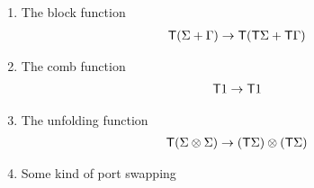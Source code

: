 \begin{definition}
\begin{enumerate}
\item The block function
    \begin{align*}
        \mathsf T (\Sigma + \Gamma) \to \mathsf T (\mathsf T \Sigma + \mathsf T \Gamma)
    \end{align*}
    \item The  comb function 
    \begin{align*}
        \mathsf T 1 \to \mathsf T 1
    \end{align*}
    \item The unfolding function 
\begin{align*}
    \mathsf T (\Sigma \otimes \Sigma) \to (\mathsf T \Sigma) \otimes (\mathsf T \Sigma)
\end{align*}
\item Some kind of port swapping
    

    

\end{enumerate}
\end{definition}



